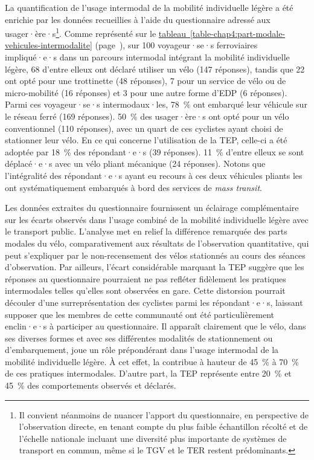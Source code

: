 \begin{refsegment}
La quantification de l'usage intermodal de la mobilité individuelle légère a été enrichie par les données recueillies à l'aide du questionnaire adressé aux usager·ère·s\footnote{
    Il convient néanmoins de nuancer l'apport du questionnaire, en perspective de l'observation directe, en tenant compte du plus faible échantillon récolté et de l'échelle nationale incluant une diversité plus importante de systèmes de transport en commun, même si le \acrshort{TGV} et le \acrshort{TER} restent prédominants.
}. Comme représenté sur le \hyperref[table-chap4:part-modale-vehicules-intermodalite]{tableau~\ref{table-chap4:part-modale-vehicules-intermodalite}} (page~\pageref{table-chap4:part-modale-vehicules-intermodalite}), sur 100 voyageur·se·s ferroviaires impliqué·e·s dans un parcours intermodal intégrant la mobilité individuelle légère, 68 d'entre elleux ont déclaré utiliser un vélo (147 réponses), tandis que 22 ont opté pour une trottinette (48 réponses), 7 pour un service de vélo ou de micro-mobilité (16 réponses) et 3 pour une autre forme d'\acrshort{EDP} (6 réponses). Parmi ces voyageur·se·s intermodaux·les, 78~\% ont embarqué leur véhicule sur le réseau ferré (169 réponses). 50~\% des usager·ère·s ont opté pour un vélo conventionnel (110 réponses), avec un quart de ces cyclistes ayant choisi de stationner leur vélo. En ce qui concerne l'utilisation de la \acrshort{TEP}, celle-ci a été adoptée par 18~\% des répondant·e·s (39 réponses). 11~\% d'entre elleux se sont déplacé·e·s avec un vélo pliant mécanique (24 réponses). Notons que l'intégralité des répondant·e·s ayant eu recours à ces deux véhicules pliants les ont systématiquement embarqués à bord des services de \textsl{mass transit}.%


Les données extraites du questionnaire fournissent un éclairage complémentaire sur les écarts observés dans l'usage combiné de la mobilité individuelle légère avec le transport public. L'analyse met en relief la différence remarquée des parts modales du vélo, comparativement aux résultats de l'observation quantitative, qui peut s'expliquer par le non-recensement des vélos stationnés au cours des séances d'observation. Par ailleurs, l'écart considérable marquant la \acrshort{TEP} suggère que les réponses au questionnaire pourraient ne pas refléter fidèlement les pratiques intermodales telles qu'elles sont observées en gare. Cette distorsion pourrait découler d'une surreprésentation des cyclistes parmi les répondant·e·s, laissant supposer que les membres de cette communauté ont été particulièrement enclin·e·s à participer au questionnaire. Il apparaît clairement que le vélo, dans ses diverses formes et avec ses différentes modalités de stationnement ou d'embarquement, joue un rôle prépondérant dans l'usage intermodal de la mobilité individuelle légère. À cet effet, la  contribue à hauteur de 45~\% à 70~\% de ces pratiques intermodales. D'autre part, la \acrshort{TEP} représente entre 20~\% et 45~\% des comportements observés et déclarés.%


\end{refsegment}
